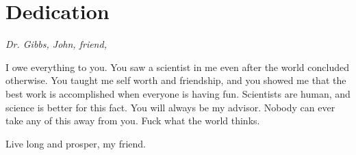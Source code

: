 \chapter*{Dedication}

\vspace{5em}

\itshape
Dr. Gibbs, John, friend, \par
\vspace{1em}

I owe everything to you. You saw a scientist in me even after the world concluded otherwise. You taught me self worth and friendship, and you showed me that the best work is accomplished when everyone is having fun. Scientists are human, and science is better for this fact. You will always be my advisor. Nobody can ever take any of this away from you. Fuck what the world thinks. \par
\vspace{1em}

Live long and prosper, my friend.
